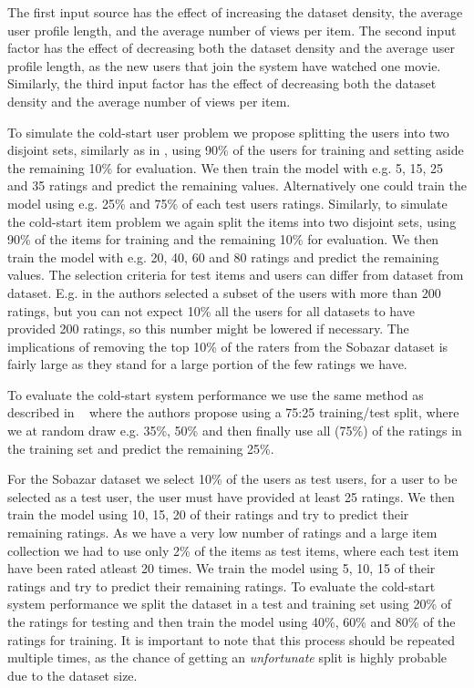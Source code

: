 The first input source has the effect of increasing the dataset density, the average user
profile length, and the average number of views per item. The second input factor has
the effect of decreasing both the dataset density and the average user profile length,
as the new users that join the system have watched one movie. Similarly, the third input
factor has the effect of decreasing both the dataset density and the average number of
views per item.

To simulate the cold-start user problem we propose splitting the users into two disjoint
sets, similarly as in \cite{Stern2009, Lam2008}, using 90\% of the users for training and
setting aside the remaining 10\% for evaluation. We then train the model with e.g. 5, 15,
25 and 35 ratings and predict the remaining values. Alternatively one could train the model
using e.g. 25\% and 75\% of each test users ratings. Similarly, to simulate the cold-start
item problem we again split the items into two disjoint sets, using 90\% of the items
for training and the remaining 10\% for evaluation.  We then train the model with
e.g. 20, 40, 60 and 80 ratings and predict the remaining values. The selection criteria
for test items and users can differ from dataset from dataset. E.g. in \cite{Rashid2002, Rashid2008}
the authors selected a subset of the users with more than 200 ratings, but you can not
expect 10\% all the users for all datasets to have provided 200 ratings, so this number
might be lowered if necessary. The implications of removing the top 10\% of the
raters from the Sobazar dataset is fairly large as they stand for a large portion
of the few ratings we have.

To evaluate the cold-start system performance we use the same method as described
in ~\cite{Agarwal2009} where the authors propose using a 75:25 training/test split,
where we at random draw e.g. 35\%, 50\% and then finally use all (75\%) of the
ratings in the training set and predict the remaining 25\%.



For the Sobazar dataset we select 10\% of the users as test users, for a user to be
selected as a test user, the user must have provided at least 25 ratings. We then train
the model using 10, 15, 20 of their ratings and try to predict their remaining ratings.
As we have a very low number of ratings and a large item collection we had to use
only 2\% of the items as test items, where each test item have been rated atleast 20 times.
We train the model using 5, 10, 15 of their ratings and try to predict their remaining
ratings. To evaluate the cold-start system performance we split the dataset in a test
and training set using 20\% of the ratings for testing and then train the model
using 40\%, 60\% and 80\% of the ratings for training. It is important to note that
this process should be repeated multiple times, as the chance of getting an
\emph{unfortunate} split is highly probable due to the dataset size.

